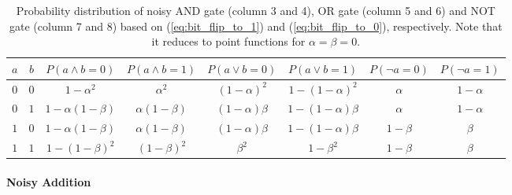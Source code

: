\begin{table}[ht]
    \centering
    \begin{tabular}{c|c||c|c||c|c||c|c}
        $a$                            & $b$                            &
        $P\left(a \land b = 0\right)$  & $P\left(a \land b = 1\right)$  &
        $P\left(a \lor b = 0\right)$   & $P\left(a \lor b = 1\right)$   &
        $P\left(\neg a = 0\right)$     & $P\left(\neg a = 1\right)$       \\
        \hline
        $0$                            & $0$                            &
        $1-\alpha^2$                   & $\alpha^2$                     &
        $\left(1-\alpha\right)^2$      & $1-\left(1-\alpha\right)^2$    &
        $\alpha$                       & $1-\alpha$                       \\
        $0$                            & $1$                            &
        $1-\alpha\left(1-\beta\right)$ & $\alpha\left(1-\beta\right)$   &
        $\left(1-\alpha\right)\beta$   & $1-\left(1-\alpha\right)\beta$ &
        $\alpha$                       & $1-\alpha$                       \\
        $1$                            & $0$                            &
        $1-\alpha\left(1-\beta\right)$ & $\alpha\left(1-\beta\right)$   &
        $\left(1-\alpha\right)\beta$   & $1-\left(1-\alpha\right)\beta$ &
        $1-\beta$                      & $\beta$                          \\
        $1$                            & $1$                            &
        $1-\left(1-\beta\right)^2$     & $\left(1-\beta\right)^2$       &
        $\beta^2$                      & $1-\beta^2$                    &
        $1-\beta$                      & $\beta$                          \\
    \end{tabular}
    \vspace{1em}
    \caption{Probability distribution of noisy AND gate (column 3 and 4), OR gate (column 5 and 6) and NOT gate (column 7 and 8) based on (\ref{eq:bit_flip_to_1}) and (\ref{eq:bit_flip_to_0}), respectively. Note that it reduces to point functions for $\alpha = \beta = 0$. \label{tab:noisy_and_or_not_gates}}
\end{table}

\paragraph{Noisy Addition}